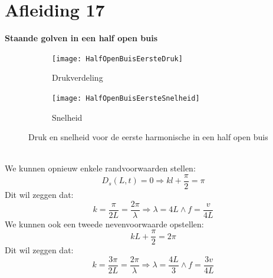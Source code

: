 \documentclass[a4paper,kul]{kulakarticle} %
\begin{document}
\section{Afleiding 17}
\textbf{Staande golven in een half open buis}\\
\begin{figure}[!h]
	\centering
	\begin{subfigure}{.5\textwidth}
		\centering
		\texttt{[image: HalfOpenBuisEersteDruk]}
		\caption{Drukverdeling}
		\label{fig:EersteHalfBuisDruk}
	\end{subfigure}%
	\begin{subfigure}{.5\textwidth}
		\centering
		\texttt{[image: HalfOpenBuisEersteSnelheid]}
		\caption{Snelheid}
		\label{fig:EersteHalfBuisSnelheid}
	\end{subfigure}
	\caption{Druk en snelheid voor de eerste harmonische in een half open buis}
	\label{fig:HalfOpenBuisEerste}
\end{figure}\\
We kunnen opnieuw enkele randvoorwaarden stellen:
\begin{equation*}
	D_s(L,t)=0\Rightarrow kl+\frac{\pi}{2} = \pi
\end{equation*}
Dit wil zeggen dat:
\begin{equation*}
	k=\frac{\pi}{2L}=\frac{2\pi}{\lambda}\Rightarrow \lambda=4L \wedge f=\frac{v}{4L}
\end{equation*}
We kunnen ook een tweede nevenvoorwaarde opstellen:
\begin{equation*}
	kL+\frac{\pi}{2}=2\pi
\end{equation*}
Dit wil zeggen dat:
\begin{equation*}
	k=\frac{3\pi}{2L}=\frac{2\pi}{\lambda}\Rightarrow \lambda=\frac{4L}{3} \wedge f=\frac{3v}{4L}
\end{equation*}
\newpage
\end{document}
